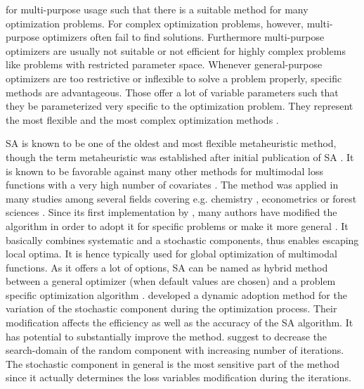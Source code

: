 for multi-purpose usage such that there is a suitable method for many optimization problems. For complex optimization problems, however, multi-purpose optimizers often fail to find solutions. Furthermore multi-purpose optimizers are usually not suitable or not efficient for highly complex problems like problems with restricted parameter space. Whenever general-purpose optimizers are too restrictive or inflexible to solve a problem properly, specific methods are advantageous. Those offer a lot of variable parameters such that they be parameterized very specific to the optimization problem. They represent the most flexible and the most complex optimization methods \citep{blum_2003}.

SA \citep{kirkpatrick_1983} is known to be one of the oldest and most flexible metaheuristic method, though the term metaheuristic was established after initial publication of SA \citep{blum_2003}. It is known to be favorable against many other methods for multimodal loss functions with a very high number of covariates \citep{corana_1987}. The method was applied in many studies among several fields covering e.g. chemistry \citep{agostini_2006}, econometrics \citep{ingber_1993} or forest sciences \citep{baskent_2002}. Since its first implementation by \citet{kirkpatrick_1983}, many authors have modified the algorithm in order to adopt it for specific problems \citep[e.g.][]{desarbo_1989, goffe_1996} or make it more general \citep[e.g.][]{xiang_2013}. It basically combines systematic and a stochastic components, thus enables escaping local optima. It is hence typically used for global optimization of multimodal functions. As it offers a lot of options, SA can be named as hybrid method between a general optimizer (when default values are chosen) and a problem specific optimization algorithm \citep{wegener_2005}. \citet{corana_1987} developed a dynamic adoption method for the variation of the stochastic component during the optimization process. Their modification affects the efficiency as well as the accuracy of the SA algorithm. It has potential to substantially improve the method. \citet{pronzato_1984} suggest to decrease the search-domain of the random component with increasing number of iterations. The stochastic component in general is the most sensitive part of the method since it actually determines the loss variables modification during the iterations.

